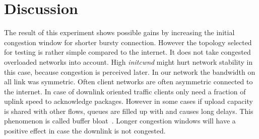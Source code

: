 \section{Discussion}
\label{sec:discussion}

The result of this experiment shows possible gains by increasing the initial
congestion window for shorter bursty connection. However the topology selected
for testing is rather simple compared to the internet. It does not take
congested overloaded networks into account. High \emph{initcwnd} might hurt
network stability in this case, because congestion is perceived later.
In our network the bandwidth on all link was symmetric. Often client
networks are often asymmetric connected to the internet.
In case of downlink oriented traffic clients only need a fraction of uplink
speed to acknowledge packages. However in some cases if upload capacity is shared
with other flows, queues are filled up with and causes long delays. This phenomenon
is called buffer bloat~\cite{rfc970}. Longer congestion windows will have a
positive effect in case the downlink is not congested.

%
%
